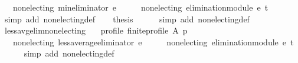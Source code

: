 \begin{isabellebody}
\ \ \ {\isachardoublequoteopen}non{\isacharunderscore}{\kern0pt}electing\ {\isacharparenleft}{\kern0pt}min{\isacharunderscore}{\kern0pt}eliminator\ e{\isacharparenright}{\kern0pt}{\isachardoublequoteclose}\isanewline
%
\isadelimproof
%
\endisadelimproof
%
\isatagproof
{}\isamarkupfalse%
\ {\isacharminus}{\kern0pt}\isanewline
\ \ \isamarkupfalse%
\ {\isachardoublequoteopen}non{\isacharunderscore}{\kern0pt}electing\ {\isacharparenleft}{\kern0pt}elimination{\isacharunderscore}{\kern0pt}module\ e\ t\ {\isacharparenleft}{\kern0pt}{\isacharless}{\kern0pt}{\isacharparenright}{\kern0pt}{\isacharparenright}{\kern0pt}{\isachardoublequoteclose}\isanewline
\ \ \ \ \isamarkupfalse%
\ {\isacharparenleft}{\kern0pt}simp\ add{\isacharcolon}{\kern0pt}\ non{\isacharunderscore}{\kern0pt}electing{\isacharunderscore}{\kern0pt}def{\isacharparenright}{\kern0pt}\isanewline
\ \ \isamarkupfalse%
\ {\isacharquery}{\kern0pt}thesis\isanewline
\ \ \ \ \isamarkupfalse%
\ {\isacharparenleft}{\kern0pt}simp\ add{\isacharcolon}{\kern0pt}\ non{\isacharunderscore}{\kern0pt}electing{\isacharunderscore}{\kern0pt}def{\isacharparenright}{\kern0pt}\isanewline
{}\isamarkupfalse%
%
\endisatagproof
{\isafoldproof}%
%
\isadelimproof
\isanewline
%
\endisadelimproof
\isanewline
{}\isamarkupfalse%
\ less{\isacharunderscore}{\kern0pt}avg{\isacharunderscore}{\kern0pt}elim{\isacharunderscore}{\kern0pt}non{\isacharunderscore}{\kern0pt}electing{\isacharcolon}{\kern0pt}\isanewline
\ \ \ profile{\isacharcolon}{\kern0pt}\ {\isachardoublequoteopen}finite{\isacharunderscore}{\kern0pt}profile\ A\ p{\isachardoublequoteclose}\isanewline
\ \ \ {\isachardoublequoteopen}non{\isacharunderscore}{\kern0pt}electing\ {\isacharparenleft}{\kern0pt}less{\isacharunderscore}{\kern0pt}average{\isacharunderscore}{\kern0pt}eliminator\ e{\isacharparenright}{\kern0pt}{\isachardoublequoteclose}\isanewline
%
\isadelimproof
%
\endisadelimproof
%
\isatagproof
{}\isamarkupfalse%
\ {\isacharminus}{\kern0pt}\isanewline
\ \ \isamarkupfalse%
\ {\isachardoublequoteopen}non{\isacharunderscore}{\kern0pt}electing\ {\isacharparenleft}{\kern0pt}elimination{\isacharunderscore}{\kern0pt}module\ e\ t\ {\isacharparenleft}{\kern0pt}{\isacharless}{\kern0pt}{\isacharparenright}{\kern0pt}{\isacharparenright}{\kern0pt}{\isachardoublequoteclose}\isanewline
\ \ \ \ \isamarkupfalse%
\ {\isacharparenleft}{\kern0pt}simp\ add{\isacharcolon}{\kern0pt}\ non{\isacharunderscore}{\kern0pt}electing{\isacharunderscore}{\kern0pt}def{\isacharparenright}{\kern0pt}\isanewline

\end{isabellebody}
